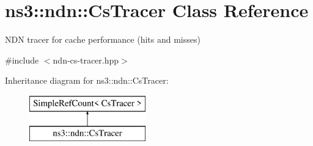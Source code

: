 \hypertarget{classns3_1_1ndn_1_1CsTracer}{}\section{ns3\+:\+:ndn\+:\+:Cs\+Tracer Class Reference}
\label{classns3_1_1ndn_1_1CsTracer}


N\+DN tracer for cache performance (hits and misses)  




{\ttfamily \#include $<$ndn-\/cs-\/tracer.\+hpp$>$}

Inheritance diagram for ns3\+:\+:ndn\+:\+:Cs\+Tracer\+:\begin{figure}[H]
\begin{center}
\leavevmode
\includegraphics[height=2.000000cm]{classns3_1_1ndn_1_1CsTracer}
\end{center}
\end{figure}
